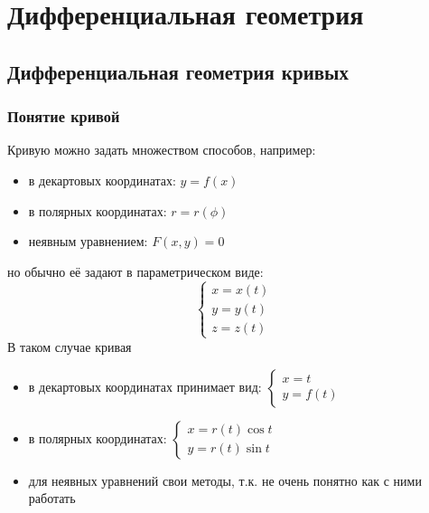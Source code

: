 \documentclass[main]{subfiles}
\begin{document}
\part*{Дифференциальная геометрия}
\chapter{Дифференциальная геометрия кривых}
\section{Понятие кривой} 
Кривую можно задать множеством способов, например:
\begin{itemize}
    \item в декартовых координатах: $y = f(x)$
    \item в полярных координатах: $r = r(\phi)$
    \item неявным уравнением: $F(x,y) = 0$
\end{itemize}
но обычно её задают в параметрическом виде:
\[\begin{cases}
        x = x(t) \\
        y = y(t) \\
        z = z(t)
    \end{cases}\]
В таком случае кривая
\begin{itemize}
    \item в декартовых координатах принимает вид: $\displaystyle\begin{cases}
                  x = t \\
                  y = f(t)
              \end{cases}$
    \item в полярных координатах: $\displaystyle \begin{cases}
                  x = r(t) \cos t \\
                  y = r(t) \sin t
              \end{cases}$
    \item для неявных уравнений свои методы, т.к. не очень понятно как с ними работать
\end{itemize}
\end{document}
